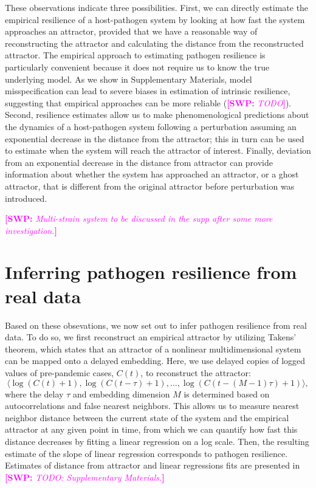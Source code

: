 \documentclass[12pt]{article}
\newcommand{\comment}{\showcomment}
\newcommand{\showcomment}[3]{\textcolor{#1}{\textbf{[#2: }\textsl{#3}\textbf{]}}}
\newcommand{\swp}[1]{\comment{magenta}{SWP}{#1}}
\begin{document}
These observations indicate three possibilities.
First, we can directly estimate the empirical resilience of a host-pathogen system by looking at how fast the system approaches an attractor, provided that we have a reasonable way of reconstructing the attractor and calculating the distance from the reconstructed attractor.
The empirical approach to estimating pathogen resilience is particularly convenient because it does not require us to know the true underlying model.
As we show in Supplementary Materials, model misspecification can lead to severe biases in estimation of intrinsic resilience, suggesting that empirical approaches can be more reliable (\swp{TODO}).
Second, resilience estimates allow us to make phenomenological predictions about the dynamics of a host-pathogen system following a perturbation assuming an exponential decrease in the distance from the attractor;
this in turn can be used to estimate when the system will reach the attractor of interest. 
Finally, deviation from an exponential decrease in the distance from attractor can provide information about whether the system has approached an attractor, or a ghost attractor, that is different from the original attractor before perturbation was introduced.

\swp{Multi-strain system to be discussed in the supp after some more investigation.}

\section*{Inferring pathogen resilience from real data}

Based on these obsevations, we now set out to infer pathogen resilience from real data.
To do so, we first reconstruct an empirical attractor by utilizing Takens' theorem, which states that an attractor of a nonlinear multidimensional system can be mapped onto a delayed embedding.
Here, we use delayed copies of logged values of pre-pandemic cases, $C(t)$, to reconstruct the attractor:
\begin{equation}
\langle\log(C(t)+1), \log(C(t-\tau)+1), \dots, \log(C(t-(M-1)\tau)+1)\rangle,
\end{equation}
where the delay $\tau$ and embedding dimension $M$ is determined based on autocorrelations and false nearest neighbors.
This allows us to measure nearest neighbor distance between the current state of the system and the empirical attractor at any given point in time, from which we can quantify how fast this distance decreases by fitting a linear regression on a log scale.
Then, the resulting estimate of the slope of linear regression corresponds to pathogen resilience.
Estimates of distance from attractor and linear regressions fits are presented in \swp{TODO: Supplementary Materials.}
\end{document}
